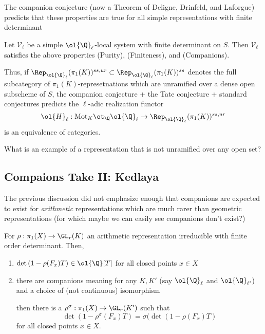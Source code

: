 \documentclass{article}
\newcommand{\Mot}{\mathrm{Mot}}
\newcommand{\Qbar}{\ol{\Q}}
\newcommand{\cV}{\mathcal{V}}
\begin{document}
The companion conjecture (now a Theorem of Deligne, Drinfeld, and Laforgue) predicts that these properties are true for all simple representations with finite determinant

\begin{thm}[Companions]
Let $\cV_\ell$ be a simple $\Qbar_{\ell}$-local system with finite determinant on $S$. Then $\cV_{\ell}$ satisfies the above properties (Purity), (Finiteness), and (Companions). 
\end{thm}

Thus, if $\Rep_{\Qbar_\ell}(\pi_1(K))^{ss, ur} \subset \Rep_{\Qbar_\ell}(\pi_1(K))^{ss}$ denotes the full subcategory of $\pi_1(K)$-represetnations which are unramified over a dense open subscheme of $S$, the companion conjecture + the Tate conjecture + standard conjectures predicts the $\ell$-adic realization functor
\[ \ol{H}_\ell : \Mot_K \ot_{\Q} \Qbar_\ell \to \Rep_{\Qbar_{\ell}}(\pi_1(K))^{ss, ur} \]
is an equivalence of categories. 


\begin{rmk}
What is an example of a representation that is not unramified over any open set? 
\end{rmk}



\subsection{Compaions Take II: Kedlaya}

The previous discussion did not emphasize enough that companions are expected to exist for \textit{arithmetic} representations which are much rarer than geometric representations (for which maybe we can easily see companions don't exist?)

\begin{conj}
For $\rho : \pi_1(X) \to \GL_r(K)$ an arithmetic representation irreducible with finite order determinant. Then,
\begin{enumerate}
\item $\det{(1 - \rho(F_x) T)} \in \Qbar[T]$ for all closed points $x \in X$
\item there are companions meaning for any $K, K'$ (say $\ol{\Q}_\ell$ and $\ol{\Q}_{\ell'}$) and a choice of (not continuous) isomorphism
\begin{center}
\end{center}
then there is a $\rho^\sigma : \pi_1(X) \to \GL_r(K')$ such that
\[ \det{(1 - \rho^\sigma(F_x) T)} = \sigma(\det{(1 - \rho(F_x) T)} \]
for all closed points $x \in X$.
\end{enumerate}
\end{conj}
\end{document}
